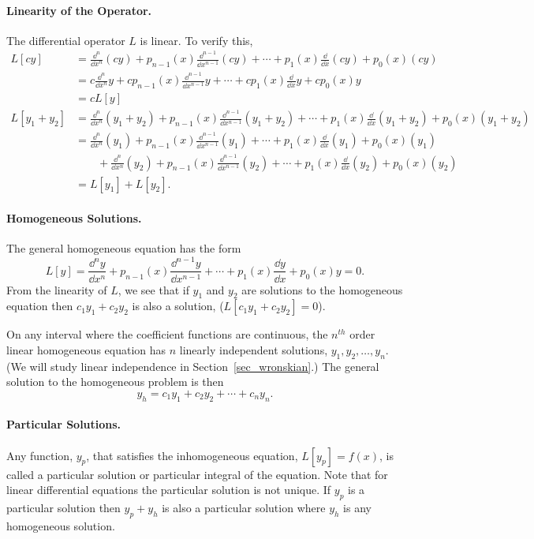 \paragraph{Linearity of the Operator.}
The differential operator $L$ is linear.  To verify this,
\begin{align*}
  L[c y]  
  &= \frac{\dd^n}{\dd x^n}(c y) + p_{n-1}(x)\frac{\dd^{n-1}}{\dd x^{n-1}}(c y) + 
  \cdots + p_1(x) \frac{\dd}{\dd x}(c y) + p_0(x)(c y) \\
  &= c\frac{\dd^n}{\dd x^n}y + c p_{n-1}(x)\frac{\dd^{n-1}}{\dd x^{n-1}}y + 
  \cdots + c p_1(x) \frac{\dd}{\dd x}y + c p_0(x)y \\
  &= c L[y] \\
  L[y_1 + y_2]
  &= \frac{\dd^n}{\dd x^n}(y_1 + y_2) + p_{n-1}(x)\frac{\dd^{n-1}}{\dd x^{n-1}}(y_1 + y_2) + 
  \cdots + p_1(x) \frac{\dd}{\dd x}(y_1 + y_2) + p_0(x)(y_1 + y_2) \\
  &= \frac{\dd^n}{\dd x^n}(y_1) + p_{n-1}(x)\frac{\dd^{n-1}}{\dd x^{n-1}}(y_1) + 
  \cdots + p_1(x) \frac{\dd}{\dd x}(y_1) + p_0(x)(y_1) \\
  &\qquad  + \frac{\dd^n}{\dd x^n}(y_2) + p_{n-1}(x)\frac{\dd^{n-1}}{\dd x^{n-1}}(y_2) + 
  \cdots + p_1(x) \frac{\dd}{\dd x}(y_2) + p_0(x)(y_2) \\
  &= L[y_1] + L[y_2].
\end{align*}


\paragraph{Homogeneous Solutions.}
The general homogeneous equation has the form
\[
L[y] = \frac{\dd^n y}{\dd x^n} + p_{n-1}(x) \frac{\dd^{n-1} y}{\dd x^{n-1}} + \cdots
+ p_1(x) \frac{\dd y}{\dd x} + p_0(x) y = 0.
\]
From the linearity of $L$, we see that if $y_1$ and $y_2$ are solutions
to the homogeneous equation then $c_1 y_1 + c_2 y_2$ is also a solution, 
($L[c_1 y_1 + c_2 y_2] = 0$).

On any interval where the coefficient functions are continuous, the
$n^{t h}$ order linear homogeneous equation has $n$ linearly independent
solutions, $y_1, y_2, \ldots, y_n$.  (We will study linear independence
in Section~\ref{sec_wronskian}.)  The general solution to the homogeneous
problem is then
\[ y_h = c_1 y_1 + c_2 y_2 + \cdots + c_n y_n.\]



\paragraph{Particular Solutions.}
Any function, $y_p$, that satisfies the inhomogeneous equation, 
$L[y_p] = f(x)$, is called a particular solution or particular integral
of the equation.  Note that for linear differential equations the
particular solution is not unique.  If $y_p$ is a particular solution 
then $y_p + y_h$ is also a particular solution where $y_h$ is any
homogeneous solution.


